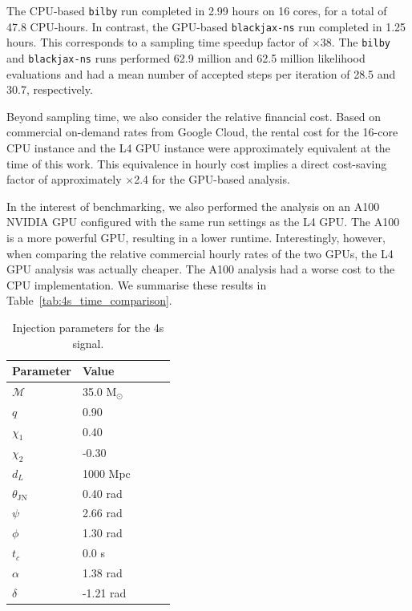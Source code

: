 \documentclass[fleqn,usenatbib]{mnras}
\begin{document}
The CPU-based \texttt{bilby} run completed in 2.99 hours on 16 cores, for a total of
47.8 CPU-hours. In contrast, the GPU-based \texttt{blackjax-ns} run
completed in 1.25 hours. This corresponds to a sampling time speedup factor
of $\times$38. The \texttt{bilby} and \texttt{blackjax-ns} runs performed
62.9 million and 62.5 million likelihood evaluations and had a
mean number of accepted steps per iteration of 28.5 and 30.7, respectively.

Beyond sampling time, we also consider the relative financial cost. Based
on commercial on-demand rates from Google Cloud, the rental cost for the 16-core
CPU instance and the L4 GPU instance were approximately equivalent at
the time of this work. This equivalence in hourly cost implies a direct
cost-saving factor of approximately $\times$2.4 for the GPU-based analysis.

In the interest of benchmarking, we also performed the analysis on 
an A100 NVIDIA GPU configured with the same run settings as the L4 GPU.
The A100 is a more powerful GPU, resulting in a lower runtime. Interestingly,
however, when comparing the relative commercial hourly rates of the two GPUs,
the L4 GPU analysis was actually cheaper. The A100 analysis had a 
worse cost to the CPU implementation. We summarise these results in 
Table~\ref{tab:4s_time_comparison}.


\begin{table}
    \centering
    \caption{Injection parameters for the 4s signal.}
    \label{tab:injection_params}
    \begin{tabular}{l l l c c}
    \hline
    \hline
    \textbf{Parameter} & \textbf{Value} \\
    \hline
    $\mathcal{M}$ & 35.0 M$_{\odot}$ \\
    $q$ & 0.90 \\
    $\chi_1$ & 0.40 \\
    $\chi_2$ & -0.30 \\
    $d_L$ & 1000 Mpc \\
    $\theta_{\textrm{JN}}$ & 0.40 rad \\
    $\psi$ & 2.66 rad \\
    $\phi$ & 1.30 rad \\
    $t_c$ & 0.0 s\\
    $\alpha$ & 1.38 rad \\
    $\delta$ & -1.21 rad \\
    \hline
    \hline
    \end{tabular}
    \end{table}
\end{document}
